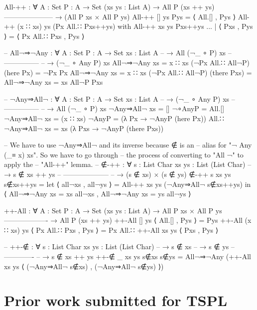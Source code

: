 \documentclass[logo,bsc,singlespacing,parskip,online]{infthesis}
\renewenvironment{code}{\mintedcopy[breaklines,breaksymbolleft=\;]{agda}}{\endmintedcopy}
\begin{document}
\begin{code}
All-++ : ∀ {A : Set} {P : A → Set} (xs ys : List A)
  → All P (xs ++ ys)
    ---------------------
  → (All P xs × All P ys)
All-++ [] ys Pys = ⟨ All.[] , Pys ⟩
All-++ (x ∷ xs) ys (Px All.∷ Pxs++ys) with All-++ xs ys Pxs++ys
... | ⟨ Pxs , Pys ⟩ = ⟨ Px All.∷ Pxs , Pys ⟩

-- All¬⇒¬Any : ∀ {A : Set} {P : A → Set} {xs : List A}
--   → All (¬_ ∘ P) xs
--     ---------------
--   → (¬_ ∘ Any P) xs
All¬⇒¬Any {xs = x ∷ xs} (¬Px All.∷ All¬P) (here Px) = ¬Px Px
All¬⇒¬Any {xs = x ∷ xs} (¬Px All.∷ All¬P) (there Pxs) =
  All¬⇒¬Any {xs = xs} All¬P Pxs

-- ¬Any⇒All¬ : ∀ {A : Set} {P : A → Set} {xs : List A}
--   → (¬_ ∘ Any P) xs
--     ---------------
--   → All (¬_ ∘ P) xs
¬Any⇒All¬ {xs = []} ¬∘AnyP = All.[]
¬Any⇒All¬ {xs = (x ∷ xs)} ¬AnyP =
  (λ Px → ¬AnyP (here Px))
    All.∷ ¬Any⇒All¬ {xs = xs} (λ Pxs → ¬AnyP (there Pxs))

-- We have to use ¬Any⇒All¬ and its inverse because ∉ is an
-- alias for "¬ Any (_≡ x) xs".  So we have to go through
-- the process of converting to "All ¬" to apply the
-- "All-++" lemma.
-- ∉-++ : ∀ {s : List Char} {xs ys : List (List Char)}
--   → s ∉ xs ++ ys
--     --------------------
--   → (s ∉ xs) × (s ∉ ys)
∉-++ {s} {xs} {ys} s∉xs++ys =
  let ⟨ all¬xs , all¬ys ⟩ = All-++ xs ys (¬Any⇒All¬ s∉xs++ys) in
    ⟨ All¬⇒¬Any {xs = xs} all¬xs
    , All¬⇒¬Any {xs = ys} all¬ys ⟩

++-All : ∀ {A : Set} {P : A → Set} (xs ys : List A)
  → All P xs × All P ys
    -------------------
  → All P (xs ++ ys)
++-All [] ys ⟨ All.[] , Pys ⟩ = Pys
++-All (x ∷ xs) ys ⟨ Px All.∷ Pxs , Pys ⟩ =
  Px All.∷ ++-All xs ys ⟨ Pxs , Pys ⟩

-- ++-∉ : ∀ {s : List Char} {xs ys : List (List Char)}
--   → s ∉ xs
--   → s ∉ ys
--     -------------
--   → s ∉ xs ++ ys
++-∉ {_} {xs} {ys} s∉xs s∉ys =
  All¬⇒¬Any (++-All xs ys ⟨ (¬Any⇒All¬ s∉xs) , (¬Any⇒All¬ s∉ys) ⟩)
\end{code}

\section{Prior work submitted for TSPL}
\end{document}
